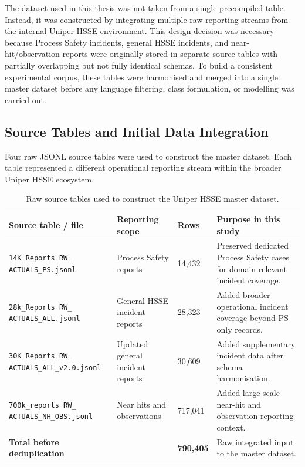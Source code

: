 \documentclass[11pt, titlepage, bibliography=totoc]{scrreprt}
\begin{document}
The dataset used in this thesis was not taken from a single precompiled table. Instead, it was constructed by integrating multiple raw reporting streams from the internal Uniper HSSE environment. This design decision was necessary because Process Safety incidents, general HSSE incidents, and near-hit/observation reports were originally stored in separate source tables with partially overlapping but not fully identical schemas. To build a consistent experimental corpus, these tables were harmonised and merged into a single master dataset before any language filtering, class formulation, or modelling was carried out.

\subsection{Source Tables and Initial Data Integration}

Four raw JSONL source tables were used to construct the master dataset. Each table represented a different operational reporting stream within the broader Uniper HSSE ecosystem.

\begin{table}[htbp]
\centering
\caption{Raw source tables used to construct the Uniper HSSE master dataset.}
\label{tab:source_tables}
\small
\renewcommand{\arraystretch}{1.2}
\begin{tabular}{p{4.8cm}p{3.4cm}p{1.8cm}p{5.0cm}}
\toprule
\textbf{Source table / file} & \textbf{Reporting scope} & \textbf{Rows} & \textbf{Purpose in this study} \\
\midrule
\texttt{14K\_Reports RW\_ ACTUALS\_PS.jsonl} 
& Process Safety reports 
& 14,432 
& Preserved dedicated Process Safety cases for domain-relevant incident coverage. \\

\texttt{28k\_Reports RW\_ ACTUALS\_ALL.jsonl} 
& General HSSE incident reports 
& 28,323 
& Added broader operational incident coverage beyond PS-only records. \\

\texttt{30K\_Reports RW\_ ACTUALS\_ALL\_v2.0.jsonl} 
& Updated general incident reports 
& 30,609 
& Added supplementary incident data after schema harmonisation. \\

\texttt{700k\_reports RW\_ ACTUALS\_NH\_OBS.jsonl} 
& Near hits and observations 
& 717,041 
& Added large-scale near-hit and observation reporting context. \\

\midrule
\textbf{Total before deduplication} 
& 
& \textbf{790,405} 
& Raw integrated input to the master dataset. \\
\bottomrule
\end{tabular}
\end{table}
\end{document}
